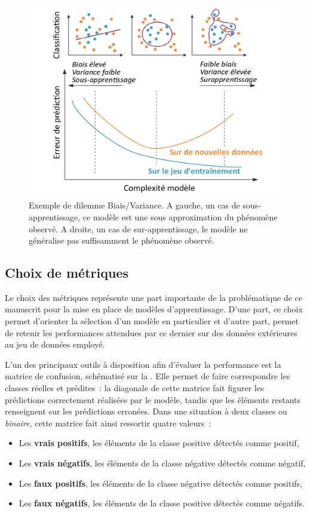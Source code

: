 \begin{figure}[H]
    \centering
    \includegraphics[width=0.8\linewidth]{contents/chapter_3/resources/example_underfit_overfit.pdf}
    \caption{Exemple de dilemme Biais/Variance. A gauche, un cas de sous-apprentissage, ce modèle est une sous approximation du phénomène observé. A droite, un cas de sur-apprentissage, le modèle ne généralise pas suffisamment le phénomène observé.}
    \label{fig:example_underfit_overfit}
\end{figure}

\subsection{Choix de métriques}
\label{subsec:metrics}
Le choix des métriques représente une part importante de la problématique de ce manuscrit pour la mise en place de modèles d’apprentissage. D'une part, ce choix permet d'orienter la sélection d'un modèle en particulier et d'autre part, permet de retenir les performances attendues par ce dernier sur des données extérieures au jeu de données employé.\par

L’un des principaux outils à disposition afin d'évaluer la performance est la matrice de confusion, schématisé sur la . Elle permet de faire correspondre les classes réelles et prédites~: la diagonale de cette matrice fait figurer les prédictions correctement réalisées par le modèle, tandis que les éléments restants renseignent sur les prédictions erronées. Dans une situation à deux classes ou \textit{binaire}, cette matrice fait ainsi ressortir quatre valeurs~:
\begin{itemize}
	\item Les \textbf{vrais positifs}, les éléments de la classe positive détectés comme positif,
	\item Les \textbf{vrais négatifs}, les éléments de la classe négative détectés comme négatif,
	\item Les \textbf{faux positifs}, les éléments de la classe négative détectés comme positifs,
	\item Les \textbf{faux négatifs}, les éléments de la classe positive détectés comme négatifs.
\end{itemize}\par

